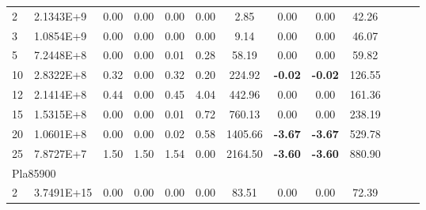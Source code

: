 {\begin{longtable}{@{}llccccccccccc@{}}
\multicolumn{1}{l|}{2}  & \multicolumn{1}{l|}{2.1343E+9}  & \multicolumn{1}{c|}{0.00}    & \multicolumn{1}{c|}{0.00} & \multicolumn{1}{c|}{0.00}   & 0.00 & \multicolumn{1}{c|}{2.85}     & 0.00            & 0.00            & 42.26     \\
\multicolumn{1}{l|}{3}  & \multicolumn{1}{l|}{1.0854E+9}  & \multicolumn{1}{c|}{0.00}    & \multicolumn{1}{c|}{0.00} & \multicolumn{1}{c|}{0.00}   & 0.00 & \multicolumn{1}{c|}{9.14}     & 0.00            & 0.00            & 46.07     \\
\multicolumn{1}{l|}{5}  & \multicolumn{1}{l|}{7.2448E+8}  & \multicolumn{1}{c|}{0.00}    & \multicolumn{1}{c|}{0.00} & \multicolumn{1}{c|}{0.01}   & 0.28 & \multicolumn{1}{c|}{58.19}    & 0.00            & 0.00            & 59.82     \\
\multicolumn{1}{l|}{10} & \multicolumn{1}{l|}{2.8322E+8}  & \multicolumn{1}{c|}{0.32}    & \multicolumn{1}{c|}{0.00} & \multicolumn{1}{c|}{0.32}   & 0.20 & \multicolumn{1}{c|}{224.92}   & \textbf{-0.02}  & \textbf{-0.02}  & 126.55    \\
\multicolumn{1}{l|}{12} & \multicolumn{1}{l|}{2.1414E+8}  & \multicolumn{1}{c|}{0.44}    & \multicolumn{1}{c|}{0.00} & \multicolumn{1}{c|}{0.45}   & 4.04 & \multicolumn{1}{c|}{442.96}   & 0.00            & 0.00            & 161.36    \\
\multicolumn{1}{l|}{15} & \multicolumn{1}{l|}{1.5315E+8}  & \multicolumn{1}{c|}{0.00}    & \multicolumn{1}{c|}{0.00} & \multicolumn{1}{c|}{0.01}   & 0.72 & \multicolumn{1}{c|}{760.13}   & 0.00            & 0.00            & 238.19    \\
\multicolumn{1}{l|}{20} & \multicolumn{1}{l|}{1.0601E+8}  & \multicolumn{1}{c|}{0.00}    & \multicolumn{1}{c|}{0.00} & \multicolumn{1}{c|}{0.02}   & 0.58 & \multicolumn{1}{c|}{1405.66}  & \textbf{-3.67}  & \textbf{-3.67}  & 529.78    \\
\multicolumn{1}{l|}{25} & \multicolumn{1}{l|}{7.8727E+7}  & \multicolumn{1}{c|}{1.50}    & \multicolumn{1}{c|}{1.50} & \multicolumn{1}{c|}{1.54}   & 0.00 & \multicolumn{1}{c|}{2164.50}  & \textbf{-3.60}  & \textbf{-3.60}  & 880.90    \\ \hline
\multicolumn{10}{l}{Pla85900}                                                                                                                                                                                                             \\ \hline
\multicolumn{1}{l|}{2}  & \multicolumn{1}{l|}{3.7491E+15} & \multicolumn{1}{c|}{0.00}    & \multicolumn{1}{c|}{0.00} & \multicolumn{1}{c|}{0.00}   & 0.00 & \multicolumn{1}{c|}{83.51}    & 0.00            & 0.00            & 72.39     \\

\end{longtable}}
